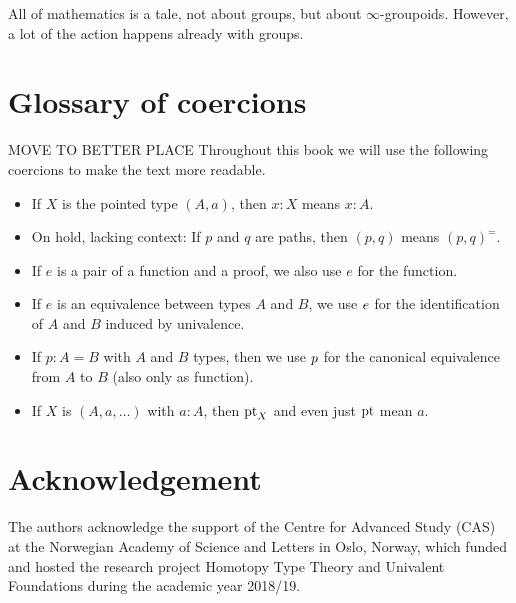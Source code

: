
All of mathematics is a tale, not about groups,
but about $\infty$-groupoids.
However, a lot of the action happens already with groups.

\newpage

\section*{Glossary of coercions}

MOVE TO BETTER PLACE
Throughout this book we will use the following coercions to make the text more readable.
\begin{itemize}[noitemsep]
\item If $X$ is the pointed type $(A,a)$, then $x:X$ means $x:A$.
\item On hold, lacking context: If $p$ and $q$ are paths, then $(p,q)$ means $(p,q)^=$.
\item If $e$ is a pair of a function and a proof, we also use $e$ for the function.
\item If $e$ is an equivalence between types $A$ and $B$, we use ${e}$ for the
identification of $A$ and $B$ induced by univalence.
\item If $p: A= B$ with $A$ and $B$ types, then we use ${p}$ for the canonical
equivalence from $A$ to $B$ (also only as function).
\item If $X$ is $(A,a,\ldots)$ with $a:A$, then $\mathrm{pt}_X$ and even just $\mathrm{pt}$ mean $a$.
\end{itemize}

\bigskip

\section*{Acknowledgement}
The authors acknowledge the support of the Centre for Advanced Study (CAS)
at the Norwegian Academy of Science and Letters
in Oslo, Norway, which funded and hosted the research project Homotopy
Type Theory and Univalent Foundations during the academic year 2018/19.



